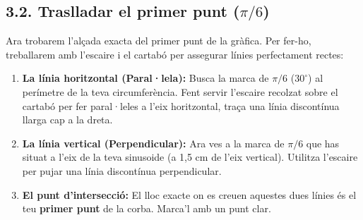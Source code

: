 \documentclass[12pt,a4paper]{article}
\begin{document}
\subsection*{3.2. Traslladar el primer punt ($\pi/6$)}

Ara trobarem l'alçada exacta del primer punt de la gràfica. Per fer-ho, treballarem amb l'escaire i el cartabó per assegurar línies perfectament rectes:

\begin{enumerate}
    \item \textbf{La línia horitzontal (Paral·lela):} Busca la marca de $\pi/6$ ($30^\circ$) al perímetre de la teva circumferència. Fent servir l'escaire recolzat sobre el cartabó per fer paral·leles a l'eix horitzontal, traça una línia discontínua llarga cap a la dreta.
    
    \item \textbf{La línia vertical (Perpendicular):} Ara ves a la marca de $\pi/6$ que has situat a l'eix de la teva sinusoide (a 1,5 cm de l'eix vertical). Utilitza l'escaire per pujar una línia discontínua perpendicular.
    
    \item \textbf{El punt d'intersecció:} El lloc exacte on es creuen aquestes dues línies és el teu \textbf{primer punt} de la corba. Marca'l amb un punt clar.
\end{enumerate}
\end{document}

